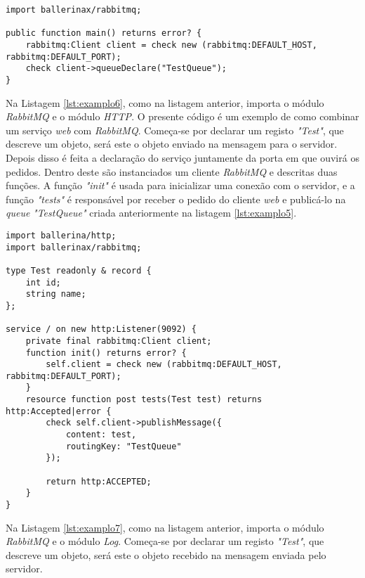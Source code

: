 \begin{minipage}{0.9\linewidth}
\begin{lstlisting}[language=ballerina, caption=Exemplo de criação de uma queue. , label=lst:examplo5]
import ballerinax/rabbitmq;

public function main() returns error? {
    rabbitmq:Client client = check new (rabbitmq:DEFAULT_HOST, rabbitmq:DEFAULT_PORT);
    check client->queueDeclare("TestQueue");
}
\end{lstlisting}
\end{minipage}

Na Listagem \ref{lst:examplo6}, como na listagem anterior, importa o módulo \textit{RabbitMQ} e o módulo \textit{HTTP}. O presente código é um exemplo de como combinar um serviço \textit{web} com \textit{RabbitMQ}. Começa-se por declarar um registo \textit{"Test"}, que descreve um objeto, será este o objeto enviado na mensagem para o servidor. Depois disso é feita a declaração do serviço juntamente da porta em que ouvirá os pedidos. Dentro deste são instanciados um cliente \textit{RabbitMQ} e descritas duas funções. A  função \textit{"init"} é usada para inicializar uma conexão com o servidor, e a função \textit{"tests"} é responsável por receber o pedido do cliente \textit{web} e publicá-lo na \textit{queue} \textit{"TestQueue"} criada anteriormente na listagem \ref{lst:examplo5}.

\begin{minipage}{0.9\linewidth}
\begin{lstlisting}[language=ballerina, caption=Exemplo de publicação de mensagem para o servidor. , label=lst:examplo6]
import ballerina/http;
import ballerinax/rabbitmq;

type Test readonly & record {
    int id;
    string name;
};

service / on new http:Listener(9092) {
    private final rabbitmq:Client client;
    function init() returns error? {
        self.client = check new (rabbitmq:DEFAULT_HOST, rabbitmq:DEFAULT_PORT);
    }
    resource function post tests(Test test) returns http:Accepted|error {
        check self.client->publishMessage({
            content: test,
            routingKey: "TestQueue"
        });

        return http:ACCEPTED;
    }
}
\end{lstlisting}
\end{minipage}

Na Listagem \ref{lst:examplo7}, como na listagem anterior, importa o módulo \textit{RabbitMQ} e o módulo \textit{Log}. Começa-se por declarar um registo \textit{"Test"}, que descreve um objeto, será este o objeto recebido na mensagem enviada pelo servidor. 

